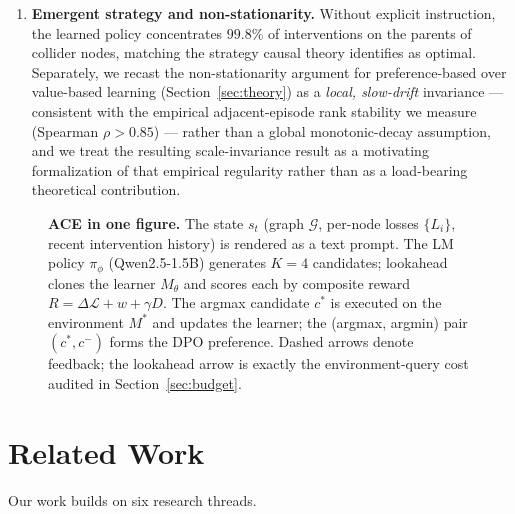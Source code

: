 \documentclass{article}
\theoremstyle{plain}
\theoremstyle{definition}
\theoremstyle{remark}
\begin{document}
\begin{enumerate}[leftmargin=1.5em,topsep=0.2em,itemsep=0.1em]
\item \textbf{Emergent strategy and non-stationarity.} Without explicit instruction, the learned policy concentrates $99.8\%$ of interventions on the parents of collider nodes, matching the strategy causal theory identifies as optimal. Separately, we recast the non-stationarity argument for preference-based over value-based learning (Section~\ref{sec:theory}) as a \emph{local, slow-drift} invariance --- consistent with the empirical adjacent-episode rank stability we measure (Spearman $\rho>0.85$) --- rather than a global monotonic-decay assumption, and we treat the resulting scale-invariance result as a motivating formalization of that empirical regularity rather than as a load-bearing theoretical contribution.
\end{enumerate}

\begin{figure}[t]
\centering

\caption{\textbf{ACE in one figure.} The state $s_t$ (graph $\mathcal{G}$, per-node losses $\{L_i\}$, recent intervention history) is rendered as a text prompt. The LM policy $\pi_\phi$ (Qwen2.5-1.5B) generates $K{=}4$ candidates; lookahead clones the learner $M_\theta$ and scores each by composite reward $R = \Delta\mathcal{L} + w + \gamma D$. The argmax candidate $c^{*}$ is executed on the environment $M^{*}$ and updates the learner; the (argmax, argmin) pair $(c^{*}, c^{-})$ forms the DPO preference. Dashed arrows denote feedback; the lookahead arrow is exactly the environment-query cost audited in Section~\ref{sec:budget}.}
\label{fig:framework}
\end{figure}

\section{Related Work}
\label{sec:related}

Our work builds on six research threads.
\end{document}
